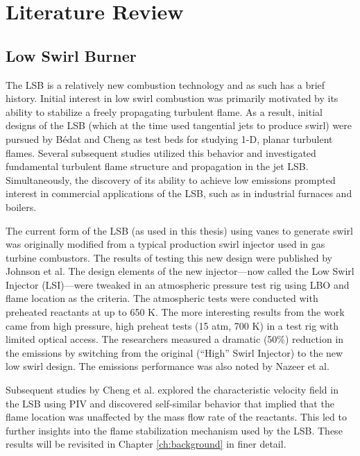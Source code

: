 \section{Literature Review}

\subsection{Low Swirl Burner}

The LSB is a relatively new combustion technology and as such has a brief history.
Initial interest in low swirl combustion was primarily motivated by its ability to stabilize a freely propagating turbulent flame.\cite{1992-chan}
As a result, initial designs of the LSB (which at the time used tangential jets to produce swirl) were pursued by B{\'edat} and Cheng\cite{1995-bedat,1995-cheng} as test beds for studying 1-D, planar turbulent flames.
Several subsequent studies\cite{2000-plessing,2001-shepherd,2002-cheng,2002-shepherd,2004-kortschik,2005-degoey,2007-bell} utilized this behavior and investigated fundamental turbulent flame structure and propagation in the jet LSB.
Simultaneously, the discovery of its ability to achieve low  emissions prompted interest in commercial applications of the LSB, such as in industrial furnaces and boilers.\cite{1998-yegian,2000-cheng,2002-littlejohn}

The current form of the LSB (as used in this thesis) using vanes to generate swirl was originally modified from a typical production swirl injector used in gas turbine combustors.
The results of testing this new design were published by Johnson et al.\cite{2005-johnson}
The design elements of the new injector---now called the Low Swirl Injector (LSI)---were tweaked in an atmospheric pressure test rig using LBO and flame location as the criteria.
The atmospheric tests were conducted with preheated reactants at up to 650 K.
The more interesting results from the work came from high pressure, high preheat tests (15 atm, 700 K) in a test rig with limited optical access.
The researchers measured a dramatic (50\%) reduction in the  emissions by switching from the original (``High'' Swirl Injector) to the new low swirl design.
The emissions performance was also noted by Nazeer et al.\cite{2006-nazeer}

Subsequent studies by Cheng et al.\cite{2006-cheng,2008-cheng-a} explored the characteristic velocity field in the LSB using PIV and discovered self-similar behavior that implied that the flame location was unaffected by the mass flow rate of the reactants.
This led to further insights into the flame stabilization mechanism used by the LSB.
These results will be revisited in Chapter \ref{ch:background} in finer detail.

